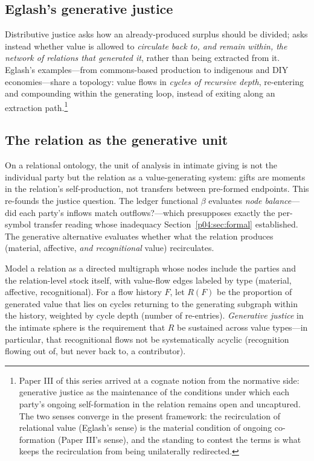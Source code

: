 \subsection{Eglash's generative justice}
Distributive justice asks how an already-produced surplus should be divided;
\textcite{eglash2016} asks instead whether value is allowed to \emph{circulate
back to, and remain within, the network of relations that generated it},
rather than being extracted from it. Eglash's examples---from commons-based
production to indigenous and DIY economies---share a topology: value flows in
\emph{cycles of recursive depth}, re-entering and compounding within the
generating loop, instead of exiting along an extraction path.\footnote{Paper
III of this series \parencite{huang2026vow} arrived at a cognate notion from the
normative side: generative justice as the maintenance of the conditions under
which each party's ongoing self-formation in the relation remains open and
uncaptured. The two senses converge in the present framework: the
recirculation of relational value (Eglash's sense) is the material condition
of ongoing co-formation (Paper III's sense), and the standing to contest the
terms is what keeps the recirculation from being unilaterally redirected.}

\subsection{The relation as the generative unit}
On a relational ontology, the unit of analysis in intimate giving is not the
individual party but the relation as a value-generating system: gifts are
moments in the relation's self-production, not transfers between pre-formed
endpoints. This re-founds the justice question. The ledger functional
$\beta$ evaluates \emph{node balance}---did each party's inflows match
outflows?---which presupposes exactly the per-symbol transfer reading whose
inadequacy Section~\ref{p04:sec:formal} established. The generative alternative
evaluates whether what the relation produces (material, affective,
\emph{and recognitional} value) recirculates.

\begin{definition}
\label{p04:def:recirc}
Model a relation as a directed multigraph whose nodes include the parties
and the relation-level stock itself, with value-flow edges labeled by type
(material, affective, recognitional). For a flow history $F$, let $R(F)$ be
the proportion of generated value that lies on cycles returning to the
generating subgraph within the history, weighted by cycle depth
(number of re-entries). \emph{Generative justice} in the intimate sphere is
the requirement that $R$ be sustained across value types---in particular,
that recognitional flows not be systematically acyclic (recognition flowing
out of, but never back to, a contributor).
\end{definition}


